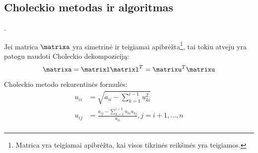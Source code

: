 
\subsection{Choleckio metodas ir algoritmas}

\cite[79-80]{textbook} \cite[81]{textbook}.

Jei matrica $\matrixa$ yra simetrinė ir teigiamai apibrėžta\footnote{Matrica
yra teigiamai apibrėžta, kai visos tikrinės reikšmės yra teigiamos.}, tai
tokiu atveju yra patogu naudoti Choleckio dekompoziciją:
\begin{equation*}
  \matrixa = \matrixl\matrixl^{T} = \matrixu^{T}\matrixu
\end{equation*}


Choleckio metodo rekurentinės formulės:
\begin{align*}
  u_{ii} &= \sqrt{a_{ii} - \sum_{k=1}^{i-1}u_{ki}^{2}} \\
  u_{ij} &= \frac{a_{ij} - \sum_{k=1}^{i-1}u_{ki}u_{kj}}{u_{ii}},
    j=i+1,\ldots,n \\
\end{align*}

